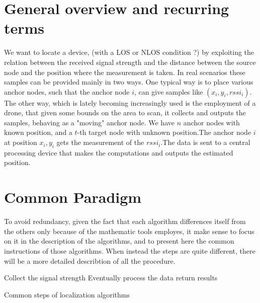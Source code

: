 \documentclass[12pt,twoside]{report}
\begin{document}
\section{General overview and recurring terms}
We want to locate a device, (with a LOS or NLOS condition ?) by exploiting the relation between the received signal strength and the distance between the source node and the position where the measurement is taken. In real scenarios these samples can be provided mainly in two ways. One typical way is to place various anchor nodes, such that the anchor node $i$, can give samples like $(x_i,y_i,rssi_i)$. The other way, which is lately becoming increasingly used is the employment of a drone, that given some bounds on the area to scan, it collects and outputs the samples, behaving as a "moving" anchor node. We have $n$ anchor nodes with known position, and a $t$-th target node with unknown position.The anchor node $i$ at position $x_i,y_i$ gets the measurement of the $rssi_i$.The data is sent to a central processing device that makes the computations and outputs the estimated position. 

\section{Common Paradigm}
To avoid redundancy, given the fact that each algorithm differences itself from the others only because of the mathematic tools employes, it make sense to focus on it in the description of the algorithms, and to present here the common instructions of those algorithms.
When instead the steps are quite different, there will be a more detailed describtion of all the procedure.

\begin{algorithm}[H]
\SetAlgoLined
Collect the signal strength\;
Eventually process the data\;
return results\;
 \caption{Common steps of localization algorithms}
\end{algorithm}
\end{document}
